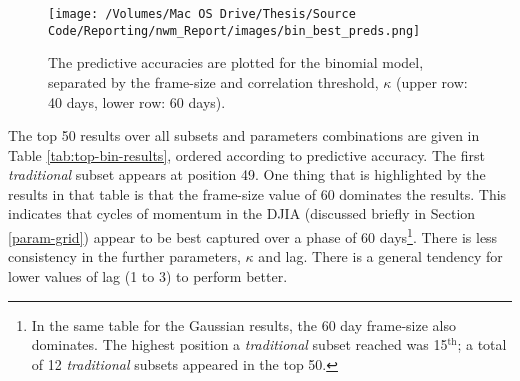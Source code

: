 \documentclass{article}
\begin{document}
\begin{figure}[htb]
\centering
\texttt{[image: /Volumes/Mac OS Drive/Thesis/Source Code/Reporting/nwm\_Report/images/bin\_best\_preds.png]}
\caption[The predictive accuracy of all subsets, using binomial regression in GLMs]{\label{fig:bin-pred-acc}The predictive accuracies are plotted for the binomial model, separated by the frame-size and correlation threshold, $\kappa$ (upper row: 40 days, lower row: 60 days).}
\end{figure}

The top 50 results over all subsets and parameters combinations are given in Table \ref{tab:top-bin-results}, ordered according to predictive accuracy. The first \emph{traditional} subset appears at position 49. One thing that is highlighted by the results in that table is that the frame-size value of 60 dominates the results. This indicates that cycles of momentum in the DJIA (discussed briefly in Section \ref{param-grid}) appear to be best captured over a phase of 60 days\footnote{In the same table for the Gaussian results, the 60 day frame-size also dominates. The highest position a \emph{traditional} subset reached was 15$^{\text{th}}$; a total of 12 \emph{traditional} subsets appeared in the top 50.}. There is less consistency in the further parameters, $\kappa$ and lag. There is a general tendency for lower values of lag (1 to 3) to perform better.
\end{document}
